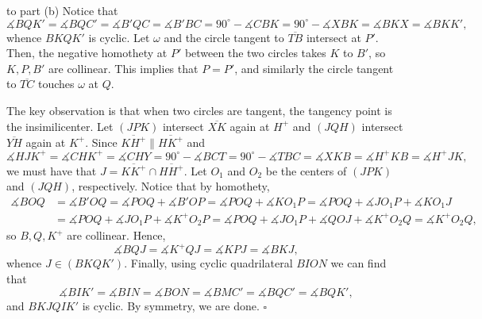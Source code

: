 \begin{customsol}{to part (b)}
Notice that $$\measuredangle BQK'=\measuredangle BQC'=\measuredangle B'QC=\measuredangle B'BC=90^\circ-\measuredangle CBK=90^\circ-\measuredangle XBK=\measuredangle BKX=\measuredangle BKK',$$
whence $BKQK'$ is cyclic. Let $\omega$ and the circle tangent to $\overline{TB}$ intersect at $P'$. Then, the negative homothety at $P'$ between the two circles takes $K$ to $B'$, so $K,P,B'$ are collinear. This implies that $P=P'$, and similarly the circle tangent to $\overline{TC}$ touches $\omega$ at $Q$.

The key observation is that when two circles are tangent, the tangency point is the insimilicenter. Let $(JPK)$ intersect $\overline{XK}$ again at $H^+$ and $(JQH)$ intersect $\overline{YH}$ again at $K^+$. Since $\overline{KH^+}\parallel\overline{HK^+}$ and $$\measuredangle HJK^+=\measuredangle CHK^+=\measuredangle CHY=90^\circ-\measuredangle BCT=90^\circ-\measuredangle TBC=\measuredangle XKB=\measuredangle H^+KB=\measuredangle H^+JK,$$
we must have that $J=\overline{KK^+}\cap\overline{HH^+}$. Let $O_1$ and $O_2$ be the centers of $(JPK)$ and $(JQH)$, respectively. Notice that by homothety,
\begin{align*}
\measuredangle BOQ&=\measuredangle B'OQ=\measuredangle POQ+\measuredangle B'OP=\measuredangle POQ+\measuredangle KO_1P=\measuredangle POQ+\measuredangle JO_1P+\measuredangle KO_1J\\
&=\measuredangle POQ+\measuredangle JO_1P+\measuredangle K^+O_2P=\measuredangle POQ+\measuredangle JO_1P+\measuredangle QOJ+\measuredangle K^+O_2Q=\measuredangle K^+O_2Q,
\end{align*}
so $B,Q,K^+$ are collinear. Hence, $$\measuredangle BQJ=\measuredangle K^+QJ=\measuredangle KPJ=\measuredangle BKJ,$$
whence $J\in(BKQK')$. Finally, using cyclic quadrilateral $BION$ we can find that $$\measuredangle BIK'=\measuredangle BIN=\measuredangle BON=\measuredangle BMC'=\measuredangle BQC'=\measuredangle BQK',$$
and $BKJQIK'$ is cyclic. By symmetry, we are done. $\square$
\end{customsol}
